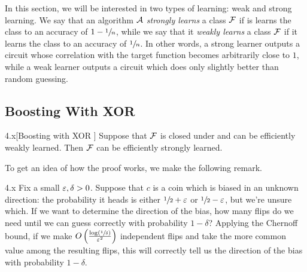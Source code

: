 \documentclass[11pt]{article}
\begin{document}
In this section, we will be interested in two types of learning: weak and strong learning. We say that an algorithm $\mathcal{A}$ \emph{strongly learns} a class $\mathcal{F}$ if is learns the class to an accuracy of $1 - \sfrac{1}{n}$, while we say that it \emph{weakly learns} a class $\mathcal{F}$ if it learns the class to an accuracy of $\sfrac{1}{n}$. In other words, a strong learner outputs a circuit whose correlation with the target function becomes arbitrarily close to $1$, while a weak learner outputs a circuit which does only slightly better than random guessing.


\subsection{Boosting With XOR}

\begin{theorem}{4.x}[Boosting with XOR \cite{BonehLipton}]
    Suppose that $\mathcal{F}$ is closed under \XOR{} and can be efficiently weakly learned. Then $\mathcal{F}$ can be efficiently strongly learned.
\end{theorem}

To get an idea of how the proof works, we make the following remark.

\begin{remark}{4.x}
    Fix a small $\varepsilon, \delta > 0$. Suppose that $c$ is a coin which is biased in an unknown direction: the probability it heads is either $\sfrac{1}{2} + \varepsilon$ or $\sfrac{1}{2} - \varepsilon$, but we're unsure which. If we want to determine the direction of the bias, how many flips do we need until we can guess correctly with probability $1 - \delta$? Applying the Chernoff bound, if we make $O\left(\frac{\log \left(\sfrac{1}{\delta}\right)}{\varepsilon^2}\right)$ independent flips and take the more common value among the resulting flips, this will correctly tell us the direction of the bias with probability $1 - \delta$.
\end{remark}
\end{document}
